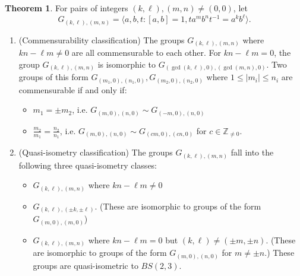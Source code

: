 \documentclass[10pt]{article}
\def\integers{{\mathbb{Z}}}
\theoremstyle{definition}
\newtheorem{theorem}{Theorem}
\begin{document}
\begin{theorem}\label{thm} For  pairs of integers $(k,\ell),(m,n)\ne (0,0)$, let  $$G_{(k,\ell),(m,n)} = \langle a,b,t: [a,b]=1, t a^m b^n t^{-1} = a^k b^\ell \rangle.$$

\begin{enumerate}[label=\Alph*.]
    \item (Commensurability classification) The groups $G_{(k,\ell),(m,n)}$ where $kn - \ell m \ne 0$ are all commensurable to each other. 
For $kn - \ell m=0$, the group $G_{(k,\ell),(m,n)}$ is isomorphic to $G_{(\gcd(k,\ell),0),(\gcd(m,n),0)}$. Two groups of this form $G_{(m_1,0),(n_1,0)}, G_{(m_2,0),(n_2,0)}$ where $1\leq |m_i| \leq n_i$ are commensurable if and only if:
\begin{itemize}
    \item $m_1 = \pm m_2$, i.e.
    $G_{(m,0),(n,0)} \sim G_{(-m,0),(n,0)}$  
    \item $\frac{m_2}{m_1} = \frac{n_2}{n_1}$, i.e.
    $G_{(m,0),(n,0)} \sim G_{(cm,0), (cn,0)}$ for  $c\in \integers_{\ne 0}$.
\end{itemize} 

\item (Quasi-isometry classification) The groups $G_{(k,\ell),(m,n)}$ fall into the following three quasi-isometry classes:
\begin{itemize}
    \item $G_{(k,\ell),(m,n)}$ where $kn - \ell m \ne 0$
    \item $G_{(k,\ell),(\pm k, \pm \ell)}$. (These  are isomorphic to groups of the form $G_{(m,0),(m,0)}$) %
    \item $G_{(k,\ell),(m,n)}$ where $kn - \ell m = 0$ but $(k,\ell)\ne (\pm m,\pm n)$. (These are isomorphic to groups of the form $G_{(m,0),(n,0)}$ for $m\ne \pm n$.) These groups are quasi-isometric to $BS(2,3)$. 
\end{itemize}

\end{enumerate}
\end{theorem}
\end{document}
